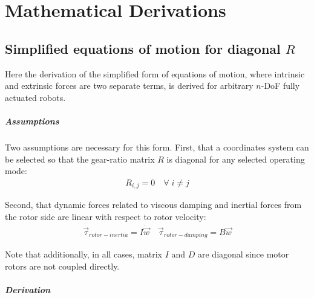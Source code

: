 \chapter{Mathematical Derivations}
\label{sec:proofs}


\section{Simplified equations of motion for diagonal $R$}
\label{sec:Rdiagndof}

Here the derivation of the simplified form of equations of motion, where intrinsic and extrinsic forces are two separate terms, is derived for arbitrary $n$-DoF fully actuated robots.

\paragraph{Assumptions} 

Two assumptions are necessary for this form. First, that a coordinates system can be selected so that the gear-ratio matrix $R$ is diagonal for any selected operating mode:
%
\begin{align}
R_{i,j} = 0 \quad \forall \; i \neq j
\end{align}
%

Second, that dynamic forces related to viscous damping and inertial forces from the rotor side are linear with respect to rotor velocity:
%
\begin{align}
\vec{\tau}_{rotor-inertia} = I \dot{\vec{w}}  \quad  \vec{\tau}_{rotor-damping} = B \vec{w}
\end{align}
%

Note that additionally, in all cases, matrix $I$ and $D$ are diagonal since motor rotors are not coupled directly. 

\paragraph{Derivation}

